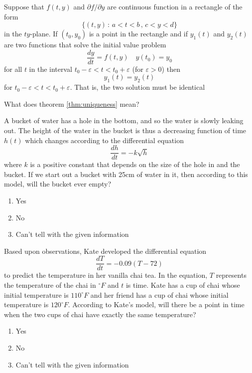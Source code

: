 \begin{thm}\label{thm:uniqueness}
    Suppose that $f(t,y)$ and $\partial f/\partial y$ are continuous function in a
    rectangle of  the form 
    \[ \{ (t,y) \, : \, a < t < b \, , \, c < y < d \} \]
    in the $ty$-plane.  If $(t_0,y_0)$ is a point in the rectangle and if $y_1(t)$ and
    $y_2(t)$ are two functions that solve the initial value problem 
    \[ \frac{dy}{dt} = f(t,y) \quad y(t_0) = y_0  \]
    for all $t$ in the interval $t_0 - \varepsilon < t < t_0 + \varepsilon$ (for
    $\varepsilon >0$) then
    \[ y_1(t) = y_2(t) \]
    for $t_0 - \varepsilon < t < t_0 + \varepsilon$.  That is, the two solution must be
    identical
\end{thm}
\begin{problem}
    What does theorem \ref{thm:uniqueness} mean?
\end{problem}


\begin{problem}
    A bucket of water has a hole in the bottom, and so the water is slowly leaking out.
    The height of the water in the bucket is thus a decreasing function of time $h(t)$
    which changes according to the differential equation 
    \[ \frac{dh}{dt} = -k\sqrt{h} \]
    where $k$ is a positive constant that depends on the size of the hole in and the
    bucket.  If we start out a bucket with 25cm of water in it, then according to this
    model, will the bucket ever empty?
    \begin{enumerate}
        \item Yes
        \item No
        \item Can't tell with the given information
    \end{enumerate}
\end{problem}



\begin{problem}
    Based upon observations, Kate developed the differential equation 
    \[ \frac{dT}{dt}= -0.09(T-72) \]
    to predict the temperature in her vanilla chai tea.  In the equation, $T$ represents
    the temperature of the chai in $^\circ F$ and $t$ is time.  Kate has a cup of chai
    whose initial temperature is $110^\circ F$ and her friend has a cup of chai whose
    initial temperature is $120^\circ F$.  According to Kate's model, will there be a
    point in time when the two cups of chai have exactly the same temperature?
    \begin{enumerate}
        \item Yes
        \item No
        \item Can't tell with the given information
    \end{enumerate}
\end{problem}



